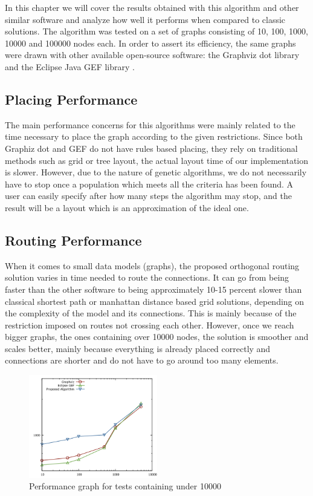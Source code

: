 \label{chap:results}

In this chapter we will cover the results obtained with this algorithm and
other similar software and analyze how well it performs when compared to
classic solutions. The algorithm was tested on a set of graphs consisting of 
10, 100, 1000, 10000 and 100000 nodes each. In order to assert its efficiency, 
the same graphs were drawn with other available open-source software: the Graphviz
dot library \cite{gansner2009drawing} and the Eclipse Java GEF library \cite{rubel2011eclipse}.

\subsection{Placing Performance}

The main performance concerns for this algorithms were mainly related to the 
time necessary to place the graph according to the given restrictions. Since 
both Graphiz dot and GEF do not have rules based placing, they rely on 
traditional methods such as grid or tree layout, the actual layout time of our 
implementation is slower. However, due to the nature of genetic algorithms, we 
do not necessarily have to stop once a population which meets all the criteria 
has been found. A user can easily specify after how many steps the algorithm may 
stop, and the result will be a layout which is an approximation of the ideal one.

\subsection{Routing Performance}

When it comes to small data models (graphs), the proposed orthogonal routing 
solution varies in time needed to route the connections. It can go from being 
faster than the other software to being approximately 10-15 percent slower than 
classical shortest path or manhattan distance based grid solutions, depending on 
the complexity of the model and its connections. This is mainly because of the 
restriction imposed on routes not crossing each other. However, once we reach 
bigger graphs, the ones containing over 10000 nodes, the solution is smoother and
scales better, mainly because everything is already placed correctly and connections 
are shorter and do not have to go around too many elements.

\begin{figure}[ht] \centering
\includegraphics[width=0.5\textwidth]{src/under_10000.png}
\caption{Performance graph for tests containing under 10000} \end{figure}

